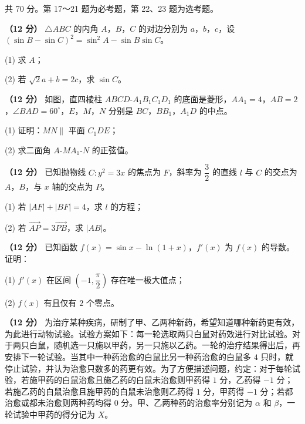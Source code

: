 \par\medskip


\begin{gktip}
共 70 分。第 17～21 题为必考题，第 22、23 题为选考题。
\end{gktip}


\textbf{（12 分）} $\triangle ABC$ 的内角 $A$，$B$，$C$ 的对边分别为 $a$，$b$，$c$，设 $(\sin B-\sin C)^{2}=\sin^{2}A-\sin B\sin C$。

  (1) 求 $A$；

  (2) 若 $\sqrt2a+b=2c$，求 $\sin C$。

\textbf{（12 分）} 如图，直四棱柱 $ABCD\text{-}A_1B_1C_1D_1$ 的底面是菱形，$AA_1=4$，$AB=2$，$\angle BAD=60^\circ$，$E$，$M$，$N$ 分别是 $BC$，$BB_1$，$A_1D$ 的中点。

\begin{center}\end{center}

  (1) 证明：$MN\parallel$ 平面 $C_1DE$；

  (2) 求二面角 $A\text{-}MA_1\text{-}N$ 的正弦值。

\textbf{（12 分）} 已知抛物线 $C:y^{2}=3x$ 的焦点为 $F$，斜率为 $\dfrac32$ 的直线 $l$ 与 $C$ 的交点为 $A$，$B$，与 $x$ 轴的交点为 $P$。

  (1) 若 $|AF|+|BF|=4$，求 $l$ 的方程；

  (2) 若 $\overrightarrow{AP}=3\overrightarrow{PB}$，求 $|AB|$。

\textbf{（12 分）} 已知函数 $f(x)=\sin x-\ln(1+x)$，$f'(x)$ 为 $f(x)$ 的导数。证明：

  (1) $f'(x)$ 在区间 $\left(-1,\dfrac\pi2\right)$ 存在唯一极大值点；

  (2) $f(x)$ 有且仅有 $2$ 个零点。

\textbf{（12 分）} 为治疗某种疾病，研制了甲、乙两种新药，希望知道哪种新药更有效，为此进行动物试验。试验方案如下：每一轮选取两只白鼠对药效进行对比试验。对于两只白鼠，随机选一只施以甲药，另一只施以乙药。一轮的治疗结果得出后，再安排下一轮试验。当其中一种药治愈的白鼠比另一种药治愈的白鼠多 $4$ 只时，就停止试验，并认为治愈只数多的药更有效。为了方便描述问题，约定：对于每轮试验，若施甲药的白鼠治愈且施乙药的白鼠未治愈则甲药得 $1$ 分，乙药得 $-1$ 分；若施乙药的白鼠治愈且施甲药的白鼠未治愈则乙药得 $1$ 分，甲药得 $-1$ 分；若都治愈或都未治愈则两种药均得 $0$ 分。甲、乙两种药的治愈率分别记为 $\alpha$ 和 $\beta$，一轮试验中甲药的得分记为 $X$。

